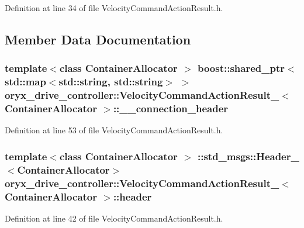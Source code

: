 \-Definition at line 34 of file \-Velocity\-Command\-Action\-Result.\-h.



\subsection{\-Member \-Data \-Documentation}
\subsubsection[{\-\_\-\-\_\-connection\-\_\-header}]{\setlength{\rightskip}{0pt plus 5cm}template$<$class Container\-Allocator $>$ boost\-::shared\-\_\-ptr$<$std\-::map$<$std\-::string, std\-::string$>$ $>$ {\bf oryx\-\_\-drive\-\_\-controller\-::\-Velocity\-Command\-Action\-Result\-\_\-}$<$ \-Container\-Allocator $>$\-::{\bf \-\_\-\-\_\-connection\-\_\-header}}\label{structoryx__drive__controller_1_1VelocityCommandActionResult___a355c536f3e1a55cfbcb18a14317e236f}


\-Definition at line 53 of file \-Velocity\-Command\-Action\-Result.\-h.

\subsubsection[{header}]{\setlength{\rightskip}{0pt plus 5cm}template$<$class Container\-Allocator $>$ \-::std\-\_\-msgs\-::\-Header\-\_\-$<$\-Container\-Allocator$>$ {\bf oryx\-\_\-drive\-\_\-controller\-::\-Velocity\-Command\-Action\-Result\-\_\-}$<$ \-Container\-Allocator $>$\-::{\bf header}}\label{structoryx__drive__controller_1_1VelocityCommandActionResult___a68950fbd6521b98aa47c862902550017}


\-Definition at line 42 of file \-Velocity\-Command\-Action\-Result.\-h.

